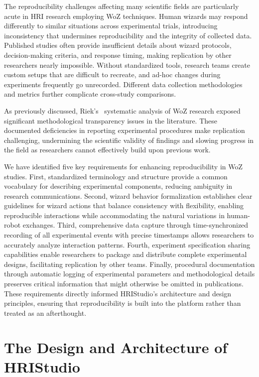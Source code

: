 \documentclass[letterpaper, 10 pt, conference]{subfiles/ieeeconf}
\begin{document}
The reproducibility challenges affecting many scientific fields are particularly acute in HRI research employing WoZ techniques. Human wizards may respond differently to similar situations across experimental trials, introducing inconsistency that undermines reproducibility and the integrity of collected data. Published studies often provide insufficient details about wizard protocols, decision-making criteria, and response timing, making replication by other researchers nearly impossible. Without standardized tools, research teams create custom setups that are difficult to recreate, and ad-hoc changes during experiments frequently go unrecorded. Different data collection methodologies and metrics further complicate cross-study comparisons.

As previously discussed, Riek's~\cite{Riek2012} systematic analysis of WoZ research exposed significant methodological transparency issues in the literature. These documented deficiencies in reporting experimental procedures make replication challenging, undermining the scientific validity of findings and slowing progress in the field as researchers cannot effectively build upon previous work.

We have identified five key requirements for enhancing reproducibility in WoZ studies. First, standardized terminology and structure provide a common vocabulary for describing experimental components, reducing ambiguity in research communications. Second, wizard behavior formalization establishes clear guidelines for wizard actions that balance consistency with flexibility, enabling reproducible interactions while accommodating the natural variations in human-robot exchanges. Third, comprehensive data capture through time-synchronized recording of all experimental events with precise timestamps allows researchers to accurately analyze interaction patterns. Fourth, experiment specification sharing capabilities enable researchers to package and distribute complete experimental designs, facilitating replication by other teams. Finally, procedural documentation through automatic logging of experimental parameters and methodological details preserves critical information that might otherwise be omitted in publications. These requirements directly informed HRIStudio's architecture and design principles, ensuring that reproducibility is built into the platform rather than treated as an afterthought.

\section{The Design and Architecture of HRIStudio}
\label{arch}
\end{document}
